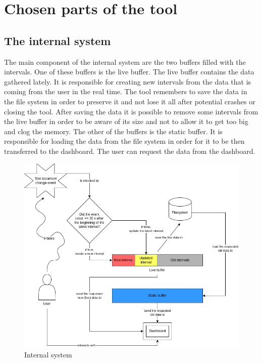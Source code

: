\section{Chosen parts of the tool}

\subsection{The internal system}\label{subsec:internal_system}

The main component of the internal system are the two buffers filled with the intervals. One of these buffers is the live buffer. The live buffer contains the data gathered lately. It is responsible for creating new intervals from the data that is coming from the user in the real time. The tool remembers to save the data in the file system in order to preserve it and not lose it all after potential crashes or closing the tool. After saving the data it is possible to remove some intervals from the live buffer in order to be aware of its size and not to allow it to get too big and clog the memory. The other of the buffers is the static buffer. It is responsible for loading the data from the file system in order for it to be then transferred to the dashboard. The user can request the data from the dashboard.

\begin{figure}[ht]
  \centering
  \includegraphics[scale=0.4]{chapters/methodology/graphics/internal-system.png}
  \caption{Internal system}
  \label{fig:internal_system}
\end{figure}

